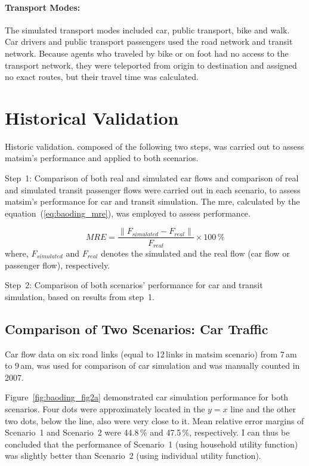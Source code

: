 \paragraph{Transport Modes:} The simulated transport modes included car, public transport, bike and walk. Car drivers and public transport passengers used the road network and transit network. Because agents who traveled by bike or on foot had no access to the transport network, they were teleported from origin to destination and assigned no exact routes, but their travel time was calculated. 

\section{Historical Validation}
Historic validation. composed of the following two steps, was carried out to assess \gls{matsim}'s performance and applied to both scenarios. 

Step~1: Comparison of both real and simulated car flows and comparison of real and simulated transit passenger flows were carried out in each scenario, to assess  \gls{matsim}'s performance for car and transit simulation. 
The \gls{mre},  calculated by the equation~(\ref{eq:baoding_mre}), was employed to assess performance.

\begin{equation}
\label{eq:baoding_mre}
MRE = \frac{\lVert F_{simulated} - F_{real} \lVert}{F_{real}} \times 100\,\%
\end{equation} 
where, $F_{simulated}$ and $F_{real}$ denotes the simulated and the real flow (car flow or passenger flow), respectively.

Step~2: Comparison of both scenarios' performance for car and transit simulation, based on results from step~1. 

\subsection{Comparison of Two Scenarios: Car Traffic}
Car flow data on six road links (equal to 12\,links in \gls{matsim} scenario) from 7\,am to 9\,am, was used for comparison of car simulation and was manually counted in 2007. 

Figure~\ref{fig:baoding_fig2a} demonstrated car simulation performance for both scenarios. 
Four dots were approximately located in the  $y=x$ line and the other two dots, below the line, also were very close to it. 
Mean relative error margins of Scenario~1 and Scenario~2 were 44.8\,\% and 47.5\,\%, respectively. 
I can thus be concluded that the performance of Scenario~1 (using  household utility function) was slightly better than Scenario~2 (using individual utility function). 

